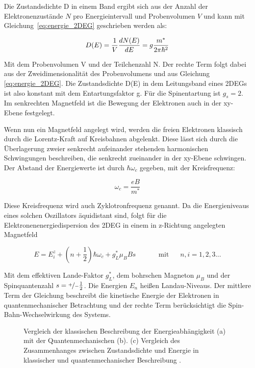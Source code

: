 Die Zustandsdichte D in einem Band ergibt sich aus der Anzahl der Elektronenzustände $N$ pro Energieintervall und Probenvolumen $V$ und kann mit Gleichung~\eqref{eq:energie_2DEG} geschrieben werden als:

\begin{equation}
	D(E)=\frac{1}{V}\frac{d N(E)}{d E}=g\frac{m^*}{2\pi\hbar^2}
	\label{eq:2DEG_zustandsdich} 
\end{equation}

Mit dem Probenvolumen V und der Teilchenzahl N. Der rechte Term folgt dabei aus der Zweidimensionalität des Probenvolumens und aus Gleichung \ref{eq:energie_2DEG}.
Die Zustandsdichte D(E) in dem Leitungsband eines 2DEGs ist also konstant mit dem Entartungsfaktor g. Für die Spinentartung ist $g_s=2$. Im senkrechten Magnetfeld ist die Bewegung der Elektronen auch in der xy-Ebene festgelegt.

Wenn nun ein Magnetfeld angelegt wird, werden die freien Elektronen klassisch durch die Lorentz-Kraft auf Kreisbahnen abgelenkt. Diese lässt sich durch die Überlagerung zweier senkrecht aufeinander stehenden harmonischen Schwingungen beschreiben, die senkrecht zueinander in der xy-Ebene schwingen. Der Abstand der Energiewerte ist durch $\hbar \omega_c$ gegeben,
mit der Kreisfrequenz:

\begin{equation}
\omega_c=\frac{eB}{m^*}
\label{eq:kreisfrequenz}
\end{equation}

Diese Kreisfrequenz wird auch Zyklotronfrequenz genannt. Da die Energieniveaus eines solchen Oszillators äquidistant sind, folgt für die Elektronenenergiedispersion des 2DEG in einem in z-Richtung angelegten Magnetfeld

\begin{equation}
E=E_i^z +(n+\frac{1}{2})\hbar\omega_c +g_L^*\mu_B Bs \text{~~~~~~~~~~mit~~~~~} n,i=1,2,3...
\label{eq:elektr_disp_bfeld}	
\end{equation}

Mit dem effektiven Lande-Faktor $g^*_L$, dem bohrschen Magneton $\mu_B$ und der Spinquantenzahl $s=\nicefrac{+}{-}\frac{1}{2}$.
Die Energien $E_n$ heißen Landau-Niveaus. Der mittlere Term der Gleichung beschreibt die kinetische Energie der Elektronen
in quantenmechanischer Betrachtung und der rechte Term berücksichtigt die Spin-Bahn-Wechselwirkung des Systems. 

\begin{figure}[h]
\centering
{}
\caption[Landau Niveaus]{Vergleich der klassischen Beschreibung der Energieabhängigkeit (a) mit der Quantenmechanischen (b). (c) Vergleich des Zusammenhanges zwischen Zustandsdichte und Energie in klassischer und quantenmechanischer Beschreibung \cite{anleitung}.}
\label{fig:Landauniveaus_Anleitungsheft}
\end{figure}

